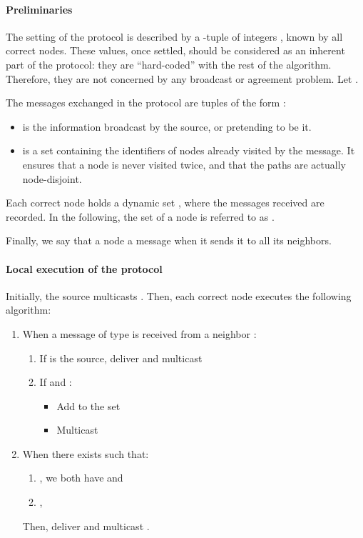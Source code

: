 \documentclass[a4paper,11pt]{article}
\begin{document}
\paragraph{Preliminaries}

The setting of the protocol is described by a -tuple of integers , known by all correct nodes. These values, once settled, should be considered as an inherent part of the protocol: they are ``hard-coded'' with the rest of the algorithm. Therefore, they are not concerned by any broadcast or agreement problem. Let .

The messages exchanged in the protocol are tuples of the form :
\begin{itemize}
\item  is the information broadcast by the source, or pretending to be it.
\item  is a set containing the identifiers of nodes already visited by the message. It ensures that a node is never visited twice, and that the paths are actually node-disjoint.
\end{itemize}
Each correct node holds a dynamic set , where the messages  received are recorded. In the following, the set  of a node  is referred to as .

Finally, we say that a node  a message when it sends it to all its neighbors.

\paragraph{Local execution of the protocol}

Initially, the source multicasts . Then, each correct node executes the following algorithm:

\begin{enumerate}
\item When a message of type  is received from a neighbor :
\begin{enumerate}
\item If  is the source, deliver  and multicast 
\item If  and :
\begin{itemize}
\item Add  to the set 
\item Multicast 
\end{itemize}
\end{enumerate}

\item When there exists  such that:
\begin{enumerate}
\item , we both have  and 
\item , 
\end{enumerate}
Then, deliver  and multicast .
\end{enumerate}
\end{document}
